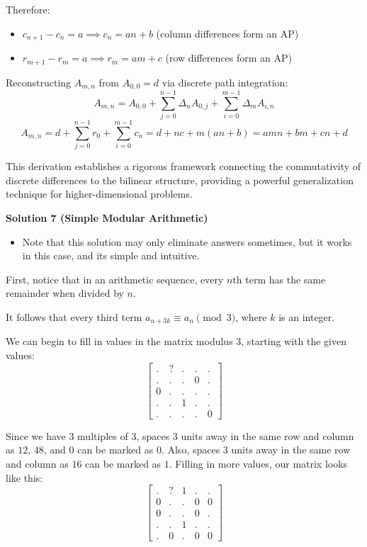 \begin{enumerate}
 Therefore:

 
            \begin{itemize}
        \item $c_{n+1} - c_n = a \implies c_n = an + b$ (column differences form an AP)
        \item $r_{m+1} - r_m = a \implies r_m = am + c$ (row differences form an AP)
            \end{itemize}
            Reconstructing $A_{m,n}$ from $A_{0,0} = d$ via discrete path integration:
 \[A_{m,n} = A_{0,0} + \sum_{j=0}^{n-1} \Delta_n A_{0,j} + \sum_{i=0}^{m-1} \Delta_m A_{i,n}\]
 \[A_{m,n} = d + \sum_{j=0}^{n-1} r_0 + \sum_{i=0}^{m-1} c_n = d + nc + m(an + b) = amn + bm + cn + d\]

 This derivation establishes a rigorous framework connecting the commutativity of discrete differences to the bilinear structure, providing a powerful generalization technique for higher-dimensional problems.

 



\textbf{Solution 7 (Simple Modular Arithmetic)}


            \begin{itemize}
        \item Note that this solution may only eliminate answers sometimes, but it works in this case, and its simple and intuitive.
            \end{itemize}
            
First, notice that in an arithmetic sequence, every $n$th term has the same remainder when divided by $n$.

 It follows that every third term $a_{n+3k} \equiv a_n \pmod{3}$, where $k$ is an integer.

 
We can begin to fill in values in the matrix modulus 3, starting with the given values:
 \[\begin{bmatrix} . & ? &.&.&. \\ .&.&.&0&.\\ 0&.&.&.&.\\ .&.&1&.&.\\ .&.&.&.&0\end{bmatrix}\]

 Since we have 3 multiples of 3, spaces 3 units away in the same row and column as $12$, $48$, and $0$ can be marked as $0$. Also, spaces 3 units away in the same row and column as $16$ can be marked as $1$. Filling in more values, our matrix looks like this:
 \[\begin{bmatrix} . & ? &1&.&. \\ 0&.&.&0&0\\ 0&.&.&0&.\\ .&.&1&.&.\\ .&0&.&0&0\end{bmatrix}\]


\end{enumerate}
